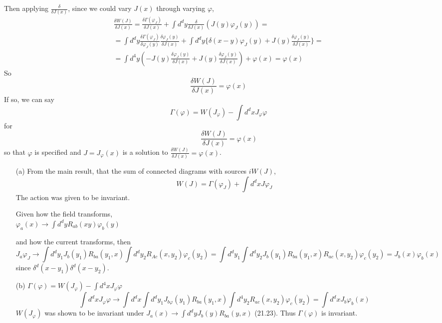\documentclass[twoside]{amsart}
\newcommand{\solutionhead}[1]
  {\smallskip
   \noindent{\large\bf Solution #1.}
   }
\begin{document}
Then applying $\frac{ \delta}{ \delta J(x)}$, since we could vary $J(x)$ through varying $\varphi$,
\[
\begin{gathered}
  \frac{ \delta W(J)}{ \delta J(x) } = \frac{ \delta \Gamma(\varphi_J)}{ \delta J(x)} + \int d^dy \frac{ \delta }{\delta J(x)} ( J(y) \varphi_J(y) ) = \\ 
  = \int d^d y \frac{ \delta \Gamma(\varphi_J)}{ \delta \varphi_J(y)} \frac{ \delta \varphi_J(y)}{ \delta J(x)} + \int d^dy \lbrace \delta(x-y)\varphi_J(y) + J(y) \frac{ \delta \varphi_J(y)}{ \delta J(x)} \rbrace = \\
  =\int d^4y \left( - J(y) \frac{ \delta \varphi_J(y)}{\delta J(x) } + J(y) \frac{ \delta \varphi_J(y)}{ \delta J(x)} \right) + \varphi(x) = \varphi(x)
\end{gathered}
\]
So 
\[
\frac{ \delta W(J)}{ \delta J(x)} = \varphi(x)
\]
If so, we can say
\[
\boxed{ \Gamma(\varphi) = W(J_{\varphi}) - \int d^dx J_{\varphi}\varphi }
\]
for 
\[
\phantom{\Gamma(\varphi)} \boxed{ \frac{ \delta W(J)}{ \delta J(x)} = \varphi(x) }
\]
so that $\varphi$ is specified and $J = J_{\varphi}(x)$ is a solution to $\frac{ \delta W(J)}{ \delta J(x)} = \varphi(x)$.  

\solutionhead{21.2} 
\begin{itemize}
\item[(a)]
From the main result, that the sum of connected diagrams with sources $iW(J)$, 
\[
W(J) = \Gamma(\varphi_J) + \int d^dx J \varphi_J
\]
The action was given to be invariant.  

Given how the field transforms, \\
$ \varphi_a(x) \to \int d^dy R_{ab}(xy) \varphi_b(y)$

and how the current transforms, then
\[
J_a \varphi_J \to \int d^d y_1 J_b(y_1) R_{ba}(y_1,x)  \int d^dy_2 R_{Ac}(x,y_2) \varphi_c(y_2) = \int d^dy_1 \int d^dy_2 J_b(y_1) R_{ba}(y_1,x) R_{ac}(x,y_2) \varphi_c(y_2) = J_b(x) \varphi_b(x)
\]
since $\delta^d(x-y_1) \delta^d(x-y_2)$.  
\item[(b)] $\Gamma(\varphi) = W(J_{\varphi}) - \int d^4x J_{\varphi}\varphi$
\[
\int d^dx J_{\varphi} \varphi \to \int d^dx \int d^dy_1 J_{b\varphi}(y_1) R_{ba}(y_1,x) \int d^4y_2 R_{ac}(x,y_2) \varphi_c(y_2) = \int d^dx J_{b} \varphi_b(x)
\]
$W(J_{\varphi})$ was shown to be invariant under $J_a(x) \to \int d^dy J_b(y) R_{ba}(y,x)$  (21.23).  Thus $\Gamma(\varphi)$ is invariant.  
\end{itemize}
\end{document}
